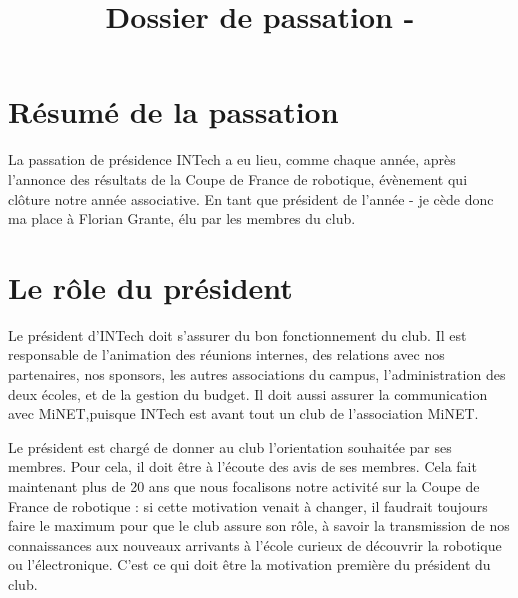 \documentclass[a4paper,10pt]{article}
\title{Dossier de passation \theannee - \theanneesuiv}
\author{\ancienprez}
\newcommand{\nouveauprez}{Florian Grante}
\newcounter{annee}
\newcounter{anneeprec}
\begin{document}
\maketitle

\begin{abstract}

\end{abstract}

\section{Résumé de la passation}
La passation de présidence INTech a eu lieu, comme chaque année, après l'annonce des résultats de la Coupe de France de robotique, 
évènement qui clôture notre année associative. En tant que président de l'année \theanneeprec - \theannee \space je cède donc ma place à 
\nouveauprez, élu par les membres du club.

\section{Le rôle du président}
Le président d'INTech doit s'assurer du bon fonctionnement du club. Il est responsable de l'animation des réunions internes,
des relations avec nos partenaires, nos sponsors, les autres associations du campus, l'administration des deux écoles, et de la gestion du budget.
Il doit aussi assurer la communication avec MiNET,puisque INTech est avant tout un club de l'association MiNET. \newline

Le président est chargé de donner au club l'orientation souhaitée par ses membres. Pour cela, il doit être à l'écoute des avis de ses membres.
Cela fait maintenant plus de 20 ans que nous focalisons notre activité sur la Coupe de France de robotique : si cette motivation venait à changer, il faudrait toujours 
faire le maximum pour que le club assure son rôle, à savoir la transmission de nos connaissances aux nouveaux arrivants à l'école
curieux de découvrir la robotique ou l'électronique. C'est ce qui doit être la motivation première du président du club.
\end{document}
